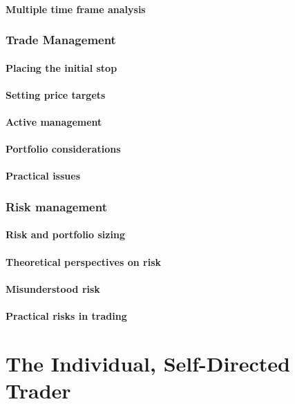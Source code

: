 \documentclass[10pt,twocolumn]{article}
\begin{document}
\subsection{Multiple time frame analysis}

\section{Trade Management}
\subsection{Placing the initial stop}
\subsection{Setting price targets}
\subsection{Active management}
\subsection{Portfolio considerations}
\subsection{Practical issues}

\section{Risk management}
\subsection{Risk and portfolio sizing}
\subsection{Theoretical perspectives on risk}
\subsection{Misunderstood risk}
\subsection{Practical risks in trading}

\part{The Individual, Self-Directed Trader}
\end{document}
